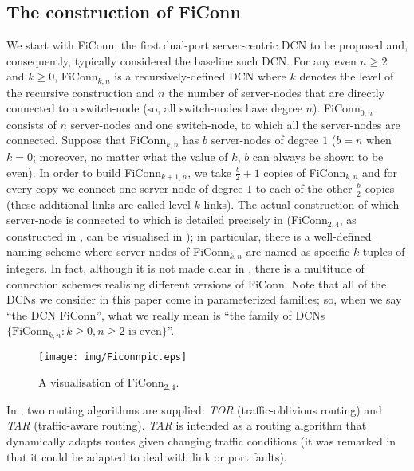 \documentclass[]{amsart}
\begin{document}
\subsection{The construction of FiConn}
\label{FiConn}

We start with FiConn, the first dual-port server-centric DCN to be proposed and, consequently, typically considered the baseline such DCN.  For any even $n\geq 2$ and $k\geq 0$, FiConn$_{k,n}$ \cite{LiGuoWu2011} is a recursively-defined DCN where $k$ denotes the level of the recursive construction and $n$ the number of server-nodes that are directly connected to a switch-node (so, all
switch-nodes have degree $n$).  FiConn$_{0,n}$ consists of $n$ server-nodes and one switch-node, to which all the server-nodes are connected. Suppose that FiConn$_{k,n}$ has $b$ server-nodes of degree $1$ ($b=n$ when $k=0$; moreover, no matter what the value of $k$, $b$ can always be shown to be even). In order to build FiConn$_{k+1,n}$, we take $\frac{b}{2}+1$ copies of FiConn$_{k,n}$ and for every copy we connect one server-node of degree $1$ to each of the other $\frac{b}{2}$ copies
(these additional links are called level $k$ links).  The actual
construction of which server-node is connected to which is detailed precisely in \cite{LiGuoWu2011} (FiConn$_{2,4}$, as constructed in \cite{LiGuoWu2011}, can be visualised in
); in particular,
there is a well-defined naming scheme where server-nodes of
FiConn$_{k,n}$ are named as specific $k$-tuples of integers. In fact, although it is not made clear in \cite{LiGuoWu2011}, there is a multitude of connection schemes realising different versions of FiConn. Note that all of the DCNs we consider in this paper come in parameterized families; so, when we say ``the DCN FiConn'', what we really mean is ``the family of DCNs $\{\mbox{FiConn}_{k,n}: k\geq 0, n \geq 2 \mbox{ is even}\}$''.

\begin{figure}[ht]
\centering
\texttt{[image: img/Ficonnpic.eps]}
\caption{A visualisation of FiConn$_{2,4}$.}
\label{Ficonnpic}
\end{figure}

In \cite{LiGuoWu2011}, two routing algorithms are supplied: \emph{TOR\/} (traffic-oblivious routing) and \emph{TAR\/} (traffic-aware routing). \emph{TAR\/} is intended as a routing algorithm that dynamically adapts routes given changing traffic conditions (it was remarked in \cite{LiGuoWu2011} that it could be adapted to deal with link or port faults).
\end{document}
